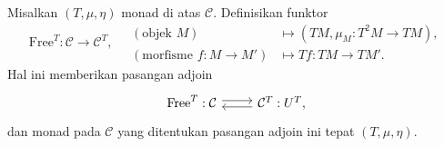 \begin{definition-proposition}\label{def:free-T-Alg}
	Misalkan $(T,\mu,\eta)$ monad di atas $\mathcal{C}$. Definisikan funktor
	\[ \mathrm{Free}^T: \mathcal{C} \to \mathcal{C}^T , \quad
	\begin{array}{rl}
		(\text{objek } M) & \mapsto (TM, \mu_M: T^2 M \to TM), \\
		(\text{morfisme } f: M \to M') & \mapsto Tf: TM \to TM'.
	\end{array}\]
	Hal ini memberikan pasangan adjoin
	\[\begin{tikzcd}
		\mathrm{Free}^T : \mathcal{C} \arrow[shift left, r] & \mathcal{C}^T: U^T \arrow[shift left, l],
	\end{tikzcd}\]
	dan monad pada $\mathcal{C}$ yang ditentukan pasangan adjoin ini tepat
	$(T,\mu,\eta)$.
\end{definition-proposition}
